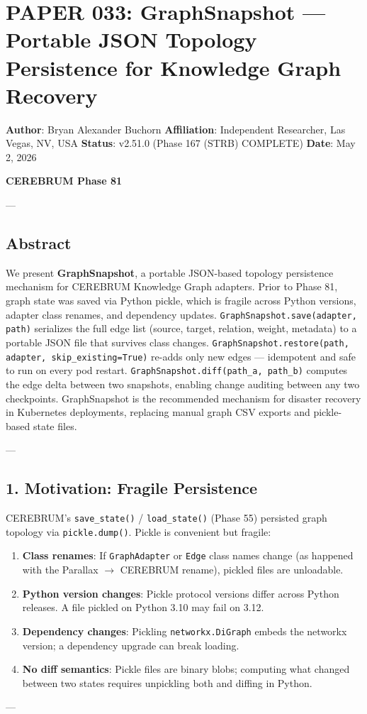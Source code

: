 \section{PAPER 033: GraphSnapshot — Portable JSON Topology Persistence for Knowledge Graph Recovery}

\textbf{Author}: Bryan Alexander Buchorn  
\textbf{Affiliation}: Independent Researcher, Las Vegas, NV, USA  
\textbf{Status}: v2.51.0 (Phase 167 (STRB) COMPLETE)
\textbf{Date}: May 2, 2026

\textbf{CEREBRUM Phase 81}

---

\subsection{Abstract}

We present \textbf{GraphSnapshot}, a portable JSON-based topology persistence mechanism for CEREBRUM Knowledge Graph adapters. Prior to Phase 81, graph state was saved via Python pickle, which is fragile across Python versions, adapter class renames, and dependency updates. \texttt{GraphSnapshot.save(adapter, path)} serializes the full edge list (source, target, relation, weight, metadata) to a portable JSON file that survives class changes. \texttt{GraphSnapshot.restore(path, adapter, skip\_existing=True)} re-adds only new edges — idempotent and safe to run on every pod restart. \texttt{GraphSnapshot.diff(path\_a, path\_b)} computes the edge delta between two snapshots, enabling change auditing between any two checkpoints. GraphSnapshot is the recommended mechanism for disaster recovery in Kubernetes deployments, replacing manual graph CSV exports and pickle-based state files.

---

\subsection{1. Motivation: Fragile Persistence}

CEREBRUM's \texttt{save\_state()} / \texttt{load\_state()} (Phase 55) persisted graph topology via \texttt{pickle.dump()}. Pickle is convenient but fragile:

\begin{enumerate}
\item \textbf{Class renames}: If \texttt{GraphAdapter} or \texttt{Edge} class names change (as happened with the Parallax $\to$ CEREBRUM rename), pickled files are unloadable.
\item \textbf{Python version changes}: Pickle protocol versions differ across Python releases. A file pickled on Python 3.10 may fail on 3.12.
\item \textbf{Dependency changes}: Pickling \texttt{networkx.DiGraph} embeds the networkx version; a dependency upgrade can break loading.
\item \textbf{No diff semantics}: Pickle files are binary blobs; computing what changed between two states requires unpickling both and diffing in Python.

\end{enumerate}
---


